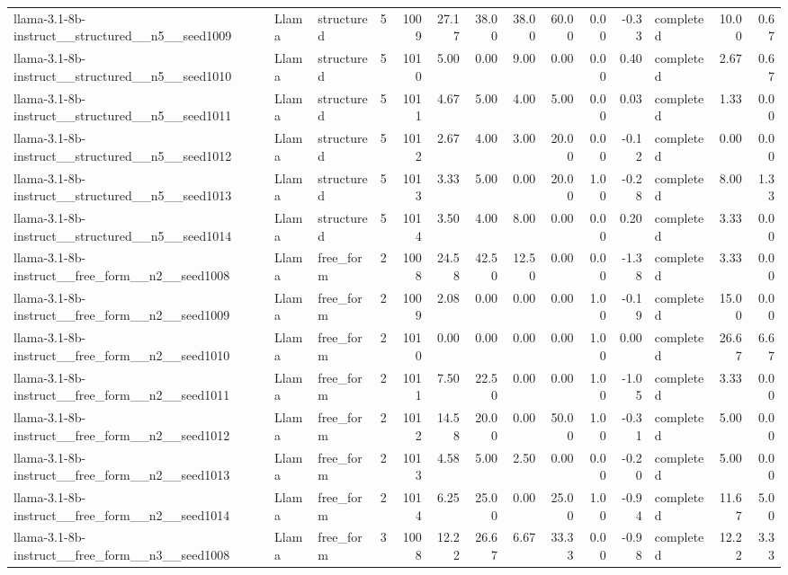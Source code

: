 \begin{longtable}{lllrrrrrrrrlrr}
llama-3.1-8b-instruct\_\_structured\_\_n5\_\_seed1009 & Llama & structured & 5 & 1009 & 27.17 & 38.00 & 38.00 & 60.00 & 0.00 & -0.33 & completed & 10.00 & 0.67 \\
llama-3.1-8b-instruct\_\_structured\_\_n5\_\_seed1010 & Llama & structured & 5 & 1010 & 5.00 & 0.00 & 9.00 & 0.00 & 0.00 & 0.40 & completed & 2.67 & 0.67 \\
llama-3.1-8b-instruct\_\_structured\_\_n5\_\_seed1011 & Llama & structured & 5 & 1011 & 4.67 & 5.00 & 4.00 & 5.00 & 0.00 & 0.03 & completed & 1.33 & 0.00 \\
llama-3.1-8b-instruct\_\_structured\_\_n5\_\_seed1012 & Llama & structured & 5 & 1012 & 2.67 & 4.00 & 3.00 & 20.00 & 0.00 & -0.12 & completed & 0.00 & 0.00 \\
llama-3.1-8b-instruct\_\_structured\_\_n5\_\_seed1013 & Llama & structured & 5 & 1013 & 3.33 & 5.00 & 0.00 & 20.00 & 1.00 & -0.28 & completed & 8.00 & 1.33 \\
llama-3.1-8b-instruct\_\_structured\_\_n5\_\_seed1014 & Llama & structured & 5 & 1014 & 3.50 & 4.00 & 8.00 & 0.00 & 0.00 & 0.20 & completed & 3.33 & 0.00 \\
llama-3.1-8b-instruct\_\_free\_form\_\_n2\_\_seed1008 & Llama & free\_form & 2 & 1008 & 24.58 & 42.50 & 12.50 & 0.00 & 0.00 & -1.38 & completed & 3.33 & 0.00 \\
llama-3.1-8b-instruct\_\_free\_form\_\_n2\_\_seed1009 & Llama & free\_form & 2 & 1009 & 2.08 & 0.00 & 0.00 & 0.00 & 1.00 & -0.19 & completed & 15.00 & 0.00 \\
llama-3.1-8b-instruct\_\_free\_form\_\_n2\_\_seed1010 & Llama & free\_form & 2 & 1010 & 0.00 & 0.00 & 0.00 & 0.00 & 1.00 & 0.00 & completed & 26.67 & 6.67 \\
llama-3.1-8b-instruct\_\_free\_form\_\_n2\_\_seed1011 & Llama & free\_form & 2 & 1011 & 7.50 & 22.50 & 0.00 & 0.00 & 1.00 & -1.05 & completed & 3.33 & 0.00 \\
llama-3.1-8b-instruct\_\_free\_form\_\_n2\_\_seed1012 & Llama & free\_form & 2 & 1012 & 14.58 & 20.00 & 0.00 & 50.00 & 1.00 & -0.31 & completed & 5.00 & 0.00 \\
llama-3.1-8b-instruct\_\_free\_form\_\_n2\_\_seed1013 & Llama & free\_form & 2 & 1013 & 4.58 & 5.00 & 2.50 & 0.00 & 0.00 & -0.20 & completed & 5.00 & 0.00 \\
llama-3.1-8b-instruct\_\_free\_form\_\_n2\_\_seed1014 & Llama & free\_form & 2 & 1014 & 6.25 & 25.00 & 0.00 & 25.00 & 1.00 & -0.94 & completed & 11.67 & 5.00 \\
llama-3.1-8b-instruct\_\_free\_form\_\_n3\_\_seed1008 & Llama & free\_form & 3 & 1008 & 12.22 & 26.67 & 6.67 & 33.33 & 0.00 & -0.98 & completed & 12.22 & 3.33 \\

\end{longtable}
